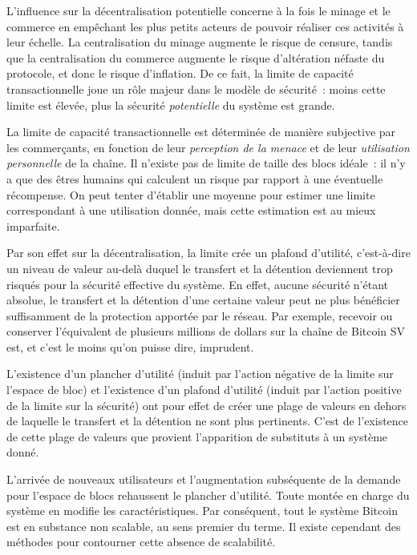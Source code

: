 L'influence sur la décentralisation potentielle concerne à la fois le minage et le commerce en empêchant les plus petits acteurs de pouvoir réaliser ces activités à leur échelle. La centralisation du minage augmente le risque de censure, tandis que la centralisation du commerce augmente le risque d'altération néfaste du protocole, et donc le risque d'inflation. De ce fait, la limite de capacité transactionnelle joue un rôle majeur dans le modèle de sécurité~: moins cette limite est élevée, plus la sécurité \emph{potentielle} du système est grande.

La limite de capacité transactionnelle est déterminée de manière subjective par les commerçants, en fonction de leur \emph{perception de la menace} et de leur \emph{utilisation personnelle} de la chaîne. Il n'existe pas de limite de taille des blocs idéale~: il n'y a que des êtres humains qui calculent un risque par rapport à une éventuelle récompense. On peut tenter d'établir une moyenne pour estimer une limite correspondant à une utilisation donnée, mais cette estimation est au mieux imparfaite.

Par son effet sur la décentralisation, la limite crée un plafond d'utilité, c'est-à-dire un niveau de valeur au-delà duquel le transfert et la détention deviennent trop risqués pour la sécurité effective du système. En effet, aucune sécurité n'étant absolue, le transfert et la détention d'une certaine valeur peut ne plus bénéficier suffisamment de la protection apportée par le réseau. Par exemple, recevoir ou conserver l'équivalent de plusieurs millions de dollars sur la chaîne de Bitcoin SV est, et c'est le moins qu'on puisse dire, imprudent.

L'existence d'un plancher d'utilité (induit par l'action négative de la limite sur l'espace de bloc) et l'existence d'un plafond d'utilité (induit par l'action positive de la limite sur la sécurité) ont pour effet de créer une plage de valeurs en dehors de laquelle le transfert et la détention ne sont plus pertinents. C'est de l'existence de cette plage de valeurs que provient l'apparition de substituts à un système donné.

L'arrivée de nouveaux utilisateurs et l'augmentation subséquente de la demande pour l'espace de blocs rehaussent le plancher d'utilité. Toute montée en charge du système en modifie les caractéristiques. Par conséquent, tout le système Bitcoin est en substance non scalable, au sens premier du terme. Il existe cependant des méthodes pour contourner cette absence de scalabilité.

